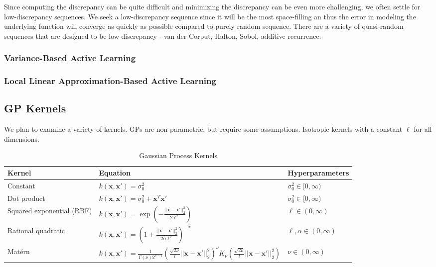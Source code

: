 \documentclass[conference]{IEEEtran}
\begin{document}
	Since computing the discrepancy can be quite difficult and minimizing the discrepancy  can be even more challenging, we often settle for low-discrepancy sequences. We seek a low-discrepancy sequence since it will be the most space-filling an thus the error in modeling the underlying function will converge as quickly as possible compared to purely random sequence. There are a variety of quasi-random sequences that are designed to be low-discrepancy - van der Corput, Halton, Sobol, additive recurrence.
	
	\subsubsection{Variance-Based Active Learning}
	
	\subsubsection{Local Linear Approximation-Based Active Learning}
	
	\subsection{GP Kernels}
	
	We plan to examine a variety of kernels. GPs are non-parametric, but require some assumptions. Isotropic kernels with a constant $\ell$ for all dimensions.
	    
    \begin{table*}[!h]
    \renewcommand{\arraystretch}{2.2}
    \centering
    \caption{Gaussian Process Kernels}
    \label{tab:gp_kernels}
        \begin{tabular}{lll}
        \toprule 
        \bfseries Kernel & \bfseries Equation & \bfseries Hyperparameters \\ \midrule
	    Constant &  $k(\mathbf{x}, \mathbf{x}') = \sigma_0^2$ & $\sigma_0^2 \in [0, \infty)$ \\
	    Dot product & $k(\mathbf{x}, \mathbf{x}') = \sigma_0^2 + \mathbf{x}^T \mathbf{x}'$ & $\sigma_0^2 \in [0, \infty)$ \\
	    Squared exponential (RBF) & $k(\mathbf{x}, \mathbf{x}') = \exp \left( -\frac{||\mathbf{x} - \mathbf{x}'||_2^2}{2\ell^2} \right)$ & $\ell \in (0, \infty)$ \\
	    Rational quadratic & $k(\mathbf{x}, \mathbf{x}') = \left(1+\frac{||\mathbf{x} - \mathbf{x}'||_2^2}{2\alpha \ell^2}\right)^{-\alpha}$ & $\ell, \alpha \in (0, \infty)$ \\
	    Mat\'ern & $k(\mathbf{x}, \mathbf{x}') = \frac{1}{\Gamma(\nu)2^{\nu-1}}\left(\frac{\sqrt{2\nu}}{l} ||\mathbf{x} - \mathbf{x}'||_2^2 \right)^\nu K_\nu\left(\frac{\sqrt{2\nu}}{l} ||\mathbf{x} - \mathbf{x}'||_2^2 \right)$ & $\nu \in (0, \infty)$ \\ \bottomrule
	    \end{tabular}
	\end{table*}
	
\end{document}
